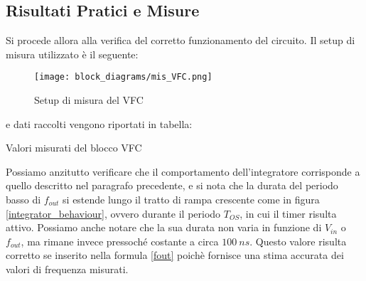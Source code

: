 
\subsection*{Risultati Pratici e Misure}


Si procede allora alla verifica del corretto funzionamento del circuito. Il setup di
misura utilizzato è il seguente:

\begin{figure}[H]
    \centering
    \texttt{[image: block\_diagrams/mis\_VFC.png]}
    \caption{Setup di misura del VFC}
    \label{mis_VFC}
\end{figure}

e dati raccolti vengono riportati in tabella:

\begin{table}[H]
    \centering
    \caption{Valori misurati del blocco VFC}
    \label{vfc_table}
\end{table}

Possiamo anzitutto verificare che il comportamento dell'integratore corrisponde a quello
descritto nel paragrafo precedente, e si nota che la durata del periodo basso di $f_{out}$
si estende lungo il tratto di rampa crescente come in figura \ref{integrator_behaviour},
ovvero durante il periodo $T_{OS}$, in cui il timer risulta attivo. Possiamo anche
notare che la sua durata non varia in funzione di $V_{in}$ o $f_{out}$, ma rimane invece
pressoché costante a circa $100\ ns$. Questo valore risulta corretto se inserito nella
formula \ref{fout} poichè fornisce una stima accurata dei valori di frequenza misurati.

